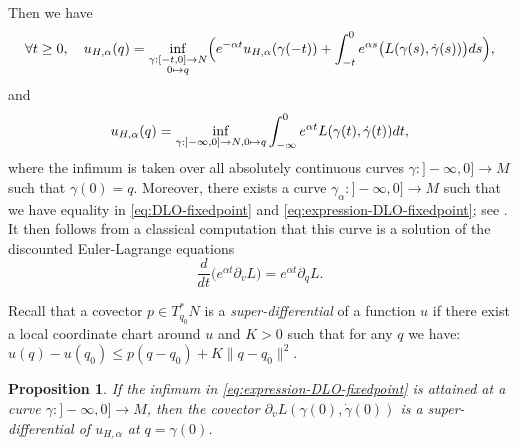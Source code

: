 \documentclass[JEP,XML,SOM,Unicode,NoFloatCountersInSection,published]{cedram}
\newcommand\mto{\mathchoice{\longmapsto}{\mapsto}{\mapsto}{\mapsto}}
\newtheorem{prop}[thm]{Proposition}
\theoremstyle{definition}
\begin{document}
Then we have
\begin{equation} \label{eq:DLO-fixedpoint}
\forall t\geq 0,\quad u_{H, \alpha}(q)=\inf_{\substack{\gamma:[-t, 0]\to N\\0\mto q}} \Bigl(e^{-\alpha t}u_{H, \alpha}(\gamma(-t))+\int_{-t}^0 e^{\alpha s}\bigl(L(\gamma (s), \dot \gamma (s))\bigr)ds\Bigr) ,\end{equation}
and
\begin{equation} \label{eq:expression-DLO-fixedpoint}
u_{H, \alpha}(q)=\inf_{\gamma:{}]-\infty, 0]\to N, 0\mto q} \int_{-\infty}^0 e^{\alpha t}L(\gamma (t), \dot \gamma (t))dt,
\end{equation}
where the infimum is taken over all absolutely continuous curves $\gamma:{}]-\infty, 0]\to M$ such that $\gamma(0)=q$.
Moreover, there exists a curve $\gamma_\alpha:{}]-\infty, 0]\to M$ such that we have equality in \eqref{eq:DLO-fixedpoint} and \eqref{eq:expression-DLO-fixedpoint}; see \cite[App.\,B]{DFIZ}. It then follows from a classical computation that this curve is a solution of the discounted Euler-Lagrange equations
\[
\frac{d}{dt}\bigl(e^{\alpha t}\partial_vL\bigr)=e^{\alpha t}\partial_qL.
\]

Recall that a covector $p\in T^*_{q_0}N$ is a \emph{super-differential} of a function $u$ if there exist a local coordinate chart around $u$ and $K>0$ such that for any $q$ we have: $u(q)-u(q_0)\leq p(q-q_0)+K\|q-q_0\|^2$.

\begin{prop}\label{prop:super-differential} If the infimum in \eqref{eq:expression-DLO-fixedpoint} is attained at a curve $\gamma:{}]-\infty, 0]\to M$,
then the covector $\partial_vL(\gamma(0), \dot\gamma(0))$ is
a super-differential of $u_{H, \alpha}$ at $q=\gamma(0)$.
\end{prop}
\end{document}
